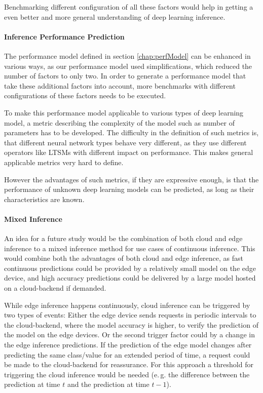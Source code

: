 Benchmarking different configuration of all these factors would help in getting a even better and more general understanding of deep learning inference.

\paragraph{Inference Performance Prediction}
The performance model defined in section \ref{chap:perfModel} can be enhanced in various ways, as our performance model used simplifications, which reduced the number of factors to only two.
In order to generate a performance model that take these additional factors into account, more benchmarks with different configurations of these factors needs to be executed.

To make this performance model applicable to various types of deep learning model, a metric describing the complexity of the model such as number of parameters has to be developed.
The difficulty in the definition of such metrics is, that different neural network types behave very different, as they use different operators like LTSMs with different impact on performance. 
This makes general applicable metrics very hard to define.

However the advantages of such metrics, if they are expressive enough, is that the performance of unknown deep learning models can be predicted, as long as their characteristics are known.
\paragraph{Mixed Inference}
An idea for a future study would be the combination of both cloud and edge inference to a mixed inference method for use cases of continuous inference.
This would combine both the advantages of both cloud and edge inference, as fast continuous predictions could be provided by a relatively small model on the edge device, and high accuracy predictions could be delivered by a large model hosted on a cloud-backend if demanded. 

While edge inference happens continuously, cloud inference can be triggered by two types of events:
Either the edge device sends requests in periodic intervals to the cloud-backend, where the model accuracy is higher, to verify the prediction of the model on the edge devices.
Or the second trigger factor could by a change in the edge inference predictions. If the prediction of the edge model changes after predicting the same class/value for an extended period of time, a request could be made to the cloud-backend for reassurance. For this approach a threshold for triggering the cloud inference would be needed (e.\,g. the difference between the prediction at time $t$ and the prediction at time $t-1$).



